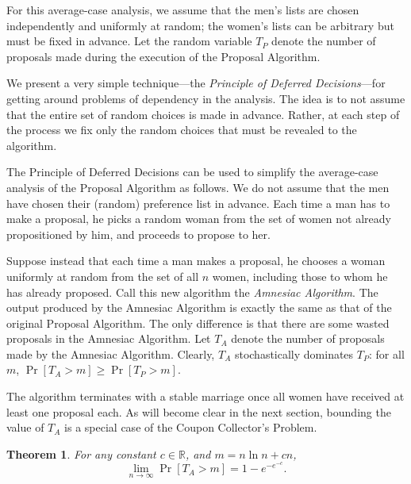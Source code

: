 \documentclass[twoside,12pt]{book}
\theoremstyle{plain}
\newtheorem{theorem}{Theorem}[chapter]
\theoremstyle{definition}
\theoremstyle{remark}
\begin{document}
For this average-case analysis, we assume that the men's lists are chosen independently and uniformly at random; the women's lists can be arbitrary but must be fixed in advance. Let the random variable $T_P$ denote the number of proposals made during the execution of the Proposal Algorithm.

We present a very simple technique---the \emph{Principle of Deferred Decisions}---for getting around problems of dependency in the analysis. The idea is to not assume that the entire set of random choices is made in advance. Rather, at each step of the process we fix only the random choices that must be revealed to the algorithm.

The Principle of Deferred Decisions can be used to simplify the average-case analysis of the Proposal Algorithm as follows. We do not assume that the men have chosen their (random) preference list in advance. Each time a man has to make a proposal, he picks a random woman from the set of women not already propositioned by him, and proceeds to propose to her.

Suppose instead that each time a man makes a proposal, he chooses a woman uniformly at random from the set of all $n$ women, including those to whom he has already proposed. Call this new algorithm the \emph{Amnesiac Algorithm}. The output produced by the Amnesiac Algorithm is exactly the same as that of the original Proposal Algorithm. The only difference is that there are some wasted proposals in the Amnesiac Algorithm. Let $T_A$ denote the number of proposals made by the Amnesiac Algorithm. Clearly, $T_A$ stochastically dominates $T_P$: for all $m$, $\Pr[T_A > m] \geq \Pr[T_P > m]$.

The algorithm terminates with a stable marriage once all women have received at least one proposal each. As will become clear in the next section, bounding the value of $T_A$ is a special case of the Coupon Collector's Problem.

\begin{theorem}
\label{thm:stable-marr-prob}
For any constant $c \in \mathbb{R}$, and $m = n \ln n + cn$,
\[
\lim_{n \to \infty} \Pr[T_A > m] = 1 - e^{-e^{-c}}.
\]
\end{theorem}
\end{document}
